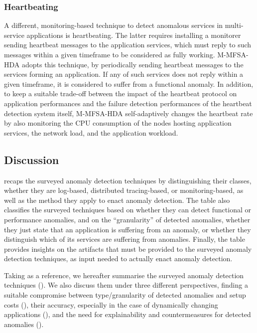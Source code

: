 \subsubsection{Heartbeating}
A different, monitoring-based technique to detect anomalous services in multi-service applications is heartbeating.
The latter requires installing a monitorer sending heartbeat messages to the application services, which must reply to such messages within a given timeframe to be considered as fully working.
M-MFSA-HDA \cite{24_Zang2018_FaultDiagnosisMicroservices} adopts this technique, by periodically sending heartbeat messages to the services forming an application.
If any of such services does not reply within a given timeframe, it is considered to suffer from a functional anomaly. %
In addition, to keep a suitable trade-off between the impact of the heartbeat protocol on application performances and the failure detection performances of the heartbeat detection system itself, M-MFSA-HDA \cite{24_Zang2018_FaultDiagnosisMicroservices} self-adaptively changes the heartbeat rate by also monitoring the CPU consumption of the nodes hosting application services, the network load, and the application workload. 

\subsection{Discussion}
\label{sec:detection:discussion}

%


 recaps the surveyed anomaly detection techniques by distinguishing their classes, \viz whether they are log-based, distributed tracing-based, or monitoring-based, as well as the method they apply to enact anomaly detection.
The table also classifies the surveyed techniques based on whether they can detect functional or performance anomalies, and on the \enquote{granularity} of detected anomalies, \viz whether they just state that an application is suffering from an anomaly, or whether they distinguish which of its services are suffering from anomalies.
Finally, the table provides insights on the artifacts that must be provided to the surveyed anomaly detection techniques, as input needed to actually enact anomaly detection.

Taking  as a reference, we hereafter summarise the surveyed anomaly detection techniques ().
We also discuss them under three different perspectives, \viz finding a suitable compromise between type/granularity of detected anomalies and setup costs (), their accuracy, especially in the case of dynamically changing applications (), and the need for explainability and countermeasures for detected anomalies (). %

